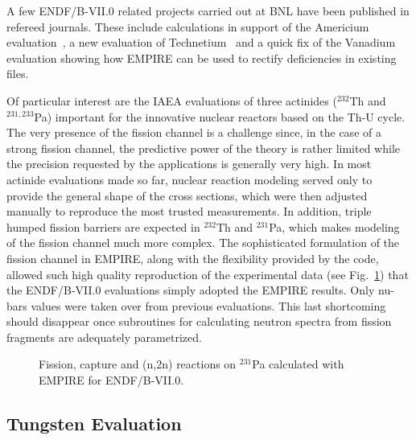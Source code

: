 A few ENDF/B-VII.0 related projects carried out at BNL have been published in
refereed journals. These include calculations in support of the Americium
evaluation~\cite{Rochman:06a}, a new evaluation of Technetium~\cite%
{Rochman:07c} and a quick fix of the Vanadium~\cite{Rochman:06b} evaluation
showing how EMPIRE can be used to rectify deficiencies in existing files.

Of particular interest are the IAEA evaluations of three actinides ($^{232}$Th
and $^{231,233}$Pa) important for the innovative nuclear reactors based on
the Th-U cycle. The very presence of the fission channel is a challenge
since, in the case of a strong fission channel, the predictive power of the
theory is rather limited while the precision requested by the applications
is generally very high. In most actinide evaluations made so far, nuclear
reaction modeling served only to provide the
general shape of the cross sections, which were then adjusted
manually to reproduce the most trusted measurements. In
addition, triple humped fission barriers are expected in $^{232}$Th and $%
^{231}$Pa, which makes modeling of the fission channel much more complex. The
sophisticated formulation of the fission channel in EMPIRE, along with the
flexibility provided by the code, allowed such high quality
reproduction of the experimental
data (see Fig.~\ref{231Pa}) that the ENDF/B-VII.0 evaluations simply
adopted the EMPIRE results.
Only nu-bars values were taken over from previous evaluations.
This last shortcoming should disappear once subroutines for calculating
neutron spectra from fission fragments are adequately parametrized.

\begin{figure}[tbph]
\caption{Fission, capture and (n,2n) reactions on $^{231}$Pa calculated with
EMPIRE for ENDF/B-VII.0.}
\label{231Pa}
\end{figure}

\subsection{Tungsten Evaluation}

